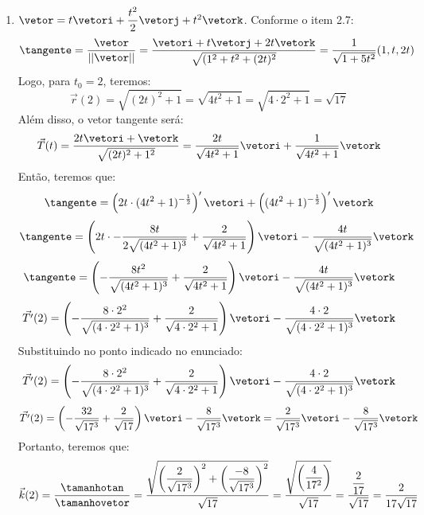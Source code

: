 \begin{enumerate}
\item $\vetor=t\vetori+\dfrac{t^2}{2}\vetorj+t^2\vetork$. Conforme o item 2.7:
	\begin{equation*}
	\tangente=\dfrac{\vetor}{\vert\vert\vetor\vert\vert}=\dfrac{\vetori+t\vetorj+2t\vetork}{\sqrt{(1^2+t^2+(2t)^2}}=\dfrac{1}{\sqrt{1+5t^2}}(1, t, 2t)
	\end{equation*}
	Logo, para $t_0=2$, teremos:
	\begin{equation*}
		\vec{r}(2)=\sqrt{(2t)^2+1}=\sqrt{4t^2+1}=\sqrt{4\cdot2^2+1}=\sqrt{17}
	\end{equation*}
	Além disso, o vetor tangente será:	
	\begin{equation*}
		\vec{T}(t)=\dfrac{2t\vetori+\vetork}{\sqrt{(2t)^2+1^2}}=\dfrac{2t}{\sqrt{4t^2+1}}\vetori+\dfrac{1}{\sqrt{4t^2+1}}\vetork
	\end{equation*}
	Então, teremos que:
	\begin{equation*}
		\tangente=\left(2t\cdot(4t^2+1)^{-\frac{1}{2}}\right)'\vetori+\left((4t^2+1)^{-\frac{1}{2}}\right)'\vetork
	\end{equation*}
	\begin{equation*}
		\tangente=\left(2t\cdot-\dfrac{8t}{2\sqrt{(4t^2+1)^3}}+\dfrac{2}{\sqrt{4t^2+1}}\right)\vetori-\dfrac{4t}{\sqrt{(4t^2+1)^3}}\vetork
	\end{equation*}	
	\begin{equation*}
		\tangente=\left(-\dfrac{8t^2}{\sqrt{(4t^2+1)^3}}+\dfrac{2}{\sqrt{4t^2+1}}\right)\vetori-\dfrac{4t}{\sqrt{(4t^2+1)^3}}\vetork
	\end{equation*}		
	\begin{equation*}
		\vec{T'}(2)=\left(-\dfrac{8\cdot2^2}{\sqrt{(4\cdot2^2+1)^3}}+\dfrac{2}{\sqrt{4\cdot2^2+1}}\right)\vetori-\dfrac{4\cdot2}{\sqrt{(4\cdot2^2+1)^3}}\vetork
	\end{equation*}
	Substituindo no ponto indicado no enunciado:
	\begin{equation*}
		\vec{T'}(2)=\left(-\dfrac{8\cdot2^2}{\sqrt{(4\cdot2^2+1)^3}}+\dfrac{2}{\sqrt{4\cdot2^2+1}}\right)\vetori-\dfrac{4\cdot2}{\sqrt{(4\cdot2^2+1)^3}}\vetork
	\end{equation*}
	\begin{equation*}
		\vec{T'}(2)=\left(-\dfrac{32}{\sqrt{17^3}}+\dfrac{2}{\sqrt{17}}\right)\vetori-\dfrac{8}{\sqrt{17^3}}\vetork=\dfrac{2}{\sqrt{17^3}}\vetori-\dfrac{8}{\sqrt{17^3}}\vetork
	\end{equation*}
	Portanto, teremos que:
	\begin{equation*}
		\vec{k}(2)=\dfrac{\tamanhotan}{\tamanhovetor}=\dfrac{\sqrt{\left(\dfrac{2}{\sqrt{17^3}}\right)^2+\left(\dfrac{-8}{\sqrt{17^3}}\right)^2}}{\sqrt{17}}=\dfrac{\sqrt{\left(\dfrac{4}{17^2}\right)}}{\sqrt{17}}=\dfrac{\dfrac{2}{17}}{\sqrt{17}}=\dfrac{2}{17\sqrt{17}}
	\end{equation*}
\end{enumerate}

